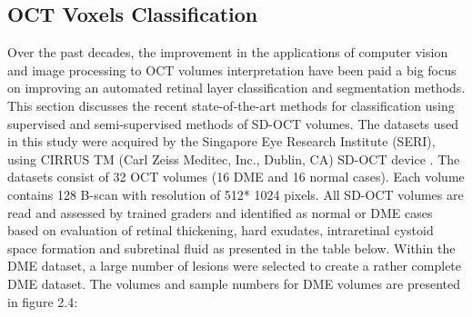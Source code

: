\subsection{OCT Voxels Classification}
Over the past decades, the improvement in the applications of computer vision and image processing to
OCT volumes interpretation have been paid a big focus on improving an automated retinal layer
classification and segmentation methods.
This section discusses the recent state-of-the-art methods for classification using supervised and semi-supervised methods of SD-OCT volumes.
The datasets used in this study were acquired by the Singapore Eye Research Institute (SERI), using CIRRUS TM (Carl Zeiss Meditec, Inc., Dublin, CA) SD-OCT device \cite{cense2006ultra}.
The datasets consist of 32 OCT volumes (16 DME and 16 normal cases).
Each volume contains 128 B-scan with resolution of 512* 1024 pixels.
All SD-OCT volumes are read and assessed by trained graders and identified as normal or DME cases based on evaluation of retinal thickening, hard exudates, intraretinal cystoid space formation and subretinal fluid as presented in the table below.
Within the DME dataset, a large number of lesions were selected to create a rather complete DME dataset.
The volumes and sample numbers for DME volumes are presented in figure 2.4:

